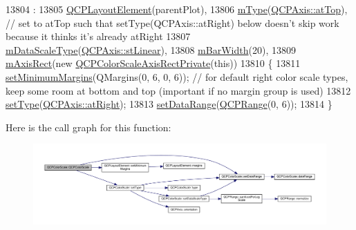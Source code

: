\begin{DoxyCode}
13804                                                     :
13805   \hyperlink{class_q_c_p_layout_element_a8947f0ada17e672aaba3d424cbbb67e3}{QCPLayoutElement}(parentPlot),
13806   \hyperlink{class_q_c_p_color_scale_a7d47ed4ab76f38e50164e9d77fe33789}{mType}(\hyperlink{class_q_c_p_axis_ae2bcc1728b382f10f064612b368bc18aac0ece2b680d3f545e701f75af1655977}{QCPAxis::atTop}), \textcolor{comment}{// set to atTop such that setType(QCPAxis::atRight) below
       doesn't skip work because it thinks it's already atRight}
13807   \hyperlink{class_q_c_p_color_scale_a2754d6a78736f64a241e333fbd955372}{mDataScaleType}(\hyperlink{class_q_c_p_axis_a36d8e8658dbaa179bf2aeb973db2d6f0aff6e30a11a828bc850caffab0ff994f6}{QCPAxis::stLinear}),
13808   \hyperlink{class_q_c_p_color_scale_a409d2ab78dff1f92da5e6acfb062e811}{mBarWidth}(20),
13809   \hyperlink{class_q_c_p_color_scale_a6e37f7d49cd614dc50ef1caae60461b9}{mAxisRect}(\textcolor{keyword}{new} \hyperlink{class_q_c_p_color_scale_a1441d8c09d7227c0c29a8d0a96d55bfe}{QCPColorScaleAxisRectPrivate}(\textcolor{keyword}{this}))
13810 \{
13811   \hyperlink{class_q_c_p_layout_element_a0a8a17abc16b7923159fcc7608f94673}{setMinimumMargins}(QMargins(0, 6, 0, 6)); \textcolor{comment}{// for default right color scale types, keep
       some room at bottom and top (important if no margin group is used)}
13812   \hyperlink{class_q_c_p_color_scale_a1bf9bdb291927c422dd66b404b206f1f}{setType}(\hyperlink{class_q_c_p_axis_ae2bcc1728b382f10f064612b368bc18aadf5509f7d29199ef2f263b1dd224b345}{QCPAxis::atRight});
13813   \hyperlink{class_q_c_p_color_scale_abe88633003a26d1e756aa74984587fef}{setDataRange}(\hyperlink{class_q_c_p_range}{QCPRange}(0, 6));
13814 \}
\end{DoxyCode}


Here is the call graph for this function\+:\nopagebreak
\begin{figure}[H]
\begin{center}
\leavevmode
\includegraphics[width=350pt]{class_q_c_p_color_scale_aa8debce1be38b54287c04d4f584394b4_cgraph}
\end{center}
\end{figure}


